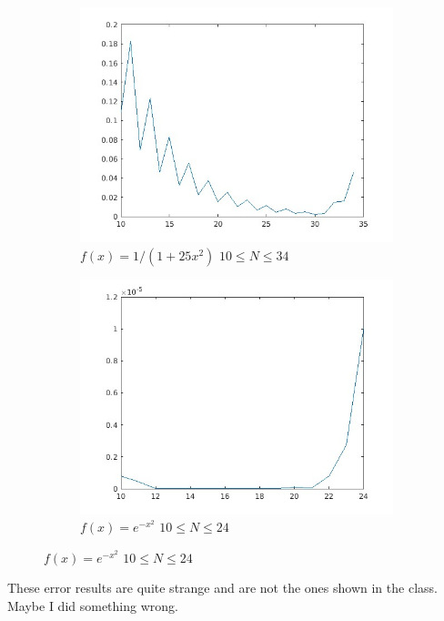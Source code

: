 \documentclass{article}
\begin{document}
\begin{figure}[H]
    \centering
    \begin{subfigure}[b]{0.4\linewidth}
	\includegraphics[width=\linewidth]{f1_error.jpg}
        \caption{$f(x) = 1 / (1 + 25 x^2)$ $10 \le N \le 34$}
    \end{subfigure}
    \begin{subfigure}[b]{0.4\linewidth}
	\includegraphics[width=\linewidth]{f2_error.jpg}
        \caption{$f(x) = e^{-x^2}$ $10 \le N \le 24$}
    \end{subfigure}
\end{figure}

These error results are quite strange and are not the ones shown in the class. 
Maybe I did something wrong.
\end{document}
